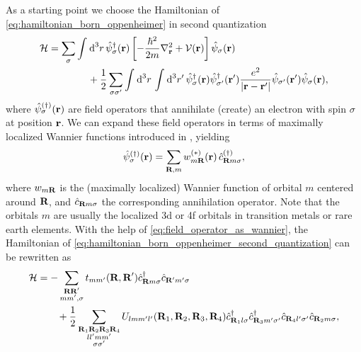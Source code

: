 \documentclass[../../main.tex]{subfiles}
\begin{document}
As a starting point we choose the Hamiltonian of \eqref{eq:hamiltonian_born_oppenheimer} in second quantization
\begin{align}\label{eq:hamiltonian_born_oppenheimer_second_quantization}
\begin{split}
	\mathcal{H}&=\sum_{\sigma}\int_{}^{}\text{d}^3r\,\hat{\psi}^{\dagger}_{\sigma}(\textbf{r})\left [-\frac{\hbar^2}{2m}\nabla^2_{\textbf{r}}+\mathcal{V}(\textbf{r})\right ]\hat{\psi}_{\sigma}(\textbf{r})\\
	 &\qquad\qquad+\frac 12 \sum_{\sigma\sigma'}\int_{}^{}\text{d}^3r\,\int_{}^{}\text{d}^3r'\,\hat{\psi}^{\dagger}_{\sigma}(\textbf{r})\hat{\psi}^{\dagger}_{\sigma'}(\textbf{r}')\frac{e^2}{|\textbf{r}-\textbf{r}'|}\hat{\psi}_{\sigma'}(\textbf{r}')\hat{\psi}_{\sigma}(\textbf{r}),
\end{split}
\end{align}
where $\hat{\psi}^{(\dagger)}_{\sigma}(\textbf{r})$ are field operators that annihilate (create) an electron with spin $\sigma$ at position $\textbf{r}$. We can expand these field operators in terms of maximally localized Wannier functions introduced in , yielding
\begin{align}\label{eq:field_operator_as_wannier}
	\hat{\psi}^{(\dagger)}_{\sigma}(\textbf{r})=\sum_{\textbf{R},m}w^{(*)}_{m\textbf{R}}(\textbf{r})\,\hat c^{(\dagger)}_{\textbf{R}m\sigma},
\end{align}
where $w_{m\textbf{R}}$ is the (maximally localized) Wannier function of orbital $m$ centered around $\textbf{R}$, and $\hat c_{\textbf{R}m\sigma}$ the corresponding annihilation operator. Note that the orbitals $m$ are usually the localized 3d or 4f orbitals in transition metals or rare earth elements. With the help of \eqref{eq:field_operator_as_wannier}, the Hamiltonian of \eqref{eq:hamiltonian_born_oppenheimer_second_quantization} can be rewritten as
\begin{align}\label{eq:general_hubbard_hamiltonian}
\begin{split}
	\mathcal{H}&=-\sum_{\substack{\textbf{R}\textbf{R}'\\ mm',\sigma}}t_{mm'}(\textbf{R},\textbf{R}')\hat c^{\dagger}_{\textbf{R}m\sigma}\hat c_{\textbf{R}'m'\sigma}\\
	&\qquad+\frac 12 \sum_{\substack{\textbf{R}_1\textbf{R}_2\textbf{R}_3\textbf{R}_4\\ ll'mm'\\\sigma\sigma'}}U_{lmm'l'}(\textbf{R}_1,\textbf{R}_2,\textbf{R}_3,\textbf{R}_4) \hat c^{\dagger}_{\textbf{R}_1l\sigma} \hat c^{\dagger}_{\textbf{R}_3 m'\sigma'} \hat c_{\textbf{R}_4l'\sigma'} \hat c_{\textbf{R}_2m\sigma},
\end{split}
\end{align}
\end{document}
